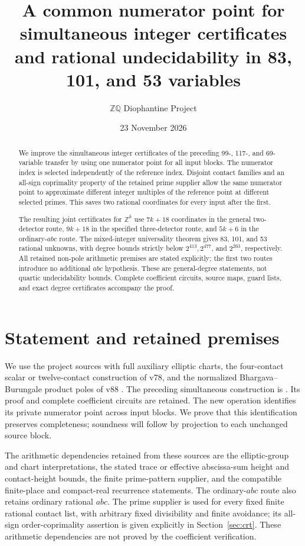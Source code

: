 \documentclass[11pt]{article}
\title{A common numerator point for simultaneous integer certificates\\
and rational undecidability in 83, 101, and 53 variables}
\author{\(\mathbb Z\mathbb Q\) Diophantine Project}
\date{23 November 2026}
\newcommand{\Z}{\mathbb Z}
\begin{document}
\maketitle
\begin{abstract}
We improve the simultaneous integer certificates of the preceding
99-, 117-, and 69-variable transfer by using one numerator point for
all input blocks. The numerator index is selected independently of the
reference index. Disjoint contact families and an all-sign coprimality
property of the retained prime supplier allow the same numerator point
to approximate different integer multiples of the reference point at
different selected primes. This saves two rational coordinates for
every input after the first.

The resulting joint certificates for \(\Z^k\) use \(7k+18\) coordinates
in the general two-detector route, \(9k+18\) in the specified
three-detector route, and \(5k+6\) in the ordinary-\(abc\) route.
The mixed-integer universality theorem gives 83, 101, and 53 rational
unknowns, with degree bounds strictly below \(2^{413},2^{477}\), and
\(2^{263}\), respectively. All retained non-pole arithmetic premises
are stated explicitly; the first two routes introduce no additional
\(abc\) hypothesis. These are general-degree statements, not quartic
undecidability bounds. Complete coefficient circuits, source maps,
guard lists, and exact degree certificates accompany the proof.
\end{abstract}

\section{Statement and retained premises}

We use the project sources with full auxiliary elliptic charts,
the four-contact scalar or twelve-contact construction of v78,
and the normalized Bhargava--Burungale product poles of v88
\cite{v78,v88}. The preceding simultaneous construction is
\cite{shared}. Its proof and complete coefficient circuits are
retained. The new operation identifies its private numerator point
across input blocks. We prove that this identification preserves
completeness; soundness will follow by projection to each unchanged
source block.

The arithmetic dependencies retained from these sources are the
elliptic-group and chart interpretations, the stated trace or effective
abscissa-sum height and contact-height bounds, the finite prime-pattern
supplier, and the compatible finite-place and compact-real recurrence
statements. The ordinary-\(abc\) route also retains ordinary rational
\(abc\). The prime supplier is used for every fixed finite rational
contact list, with arbitrary fixed divisibility and finite avoidance;
its all-sign order-coprimality assertion is given explicitly in
Section~\ref{sec:crt}. These arithmetic dependencies are not proved
by the coefficient verification.
\end{document}
